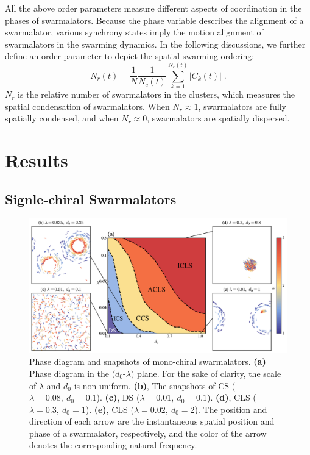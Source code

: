 \documentclass{article}
\begin{document}
All the above order parameters measure different aspects of coordination in the phases of swarmalators. Because the phase variable describes the alignment of a swarmalator, various synchrony states imply the motion alignment of swarmalators in the swarming dynamics. 
In the following discussions, we further define an order parameter to depict the spatial swarming ordering:
\begin{equation}
    \label{eq:relativeNumber}
    N_r\left( t \right) =\frac{1}{N}\frac{1}{N_c\left( t \right)}\sum_{k=1}^{N_c\left( t \right)}{\left| C_k\left( t \right) \right|}\;.
\end{equation}
$N_r$ is the relative number of swarmalators in the clusters, which measures the spatial condensation of swarmalators. When $N_r\approx 1$, swarmalators are fully spatially condensed, and when $N_r\approx 0$, swarmalators are spatially dispersed. 

\newpage
\section{Results}
\subsection{Signle-chiral Swarmalators}
\begin{figure}[H]
    \includegraphics[width=\textwidth]{./figs/MonoChiralPhaseDiagram.pdf}
    \caption{
        \label{fig:MonoPhaseDiagram} 
        Phase diagram and snapshots of mono-chiral swarmalators.
        \textbf{(a)} Phase diagram in the $(d_0$-$\lambda)$ plane. 
        For the sake of clarity, the scale of $\lambda$ and $d_0$ is non-uniform.
        \textbf{(b)}, The snapshots of CS ($\lambda=0.08,\ d_0=0.1$). 
        \textbf{(c)}, DS ($\lambda=0.01,\ d_0=0.1$).
        \textbf{(d)}, CLS ($\lambda=0.3,\ d_0=1$).
        \textbf{(e)}, CLS ($\lambda=0.02,\ d_0=2$). The position and direction of each arrow are the instantaneous spatial position and phase of a swarmalator, respectively, and the color of the arrow denotes the corresponding natural frequency.
    }
\end{figure}
\end{document}
